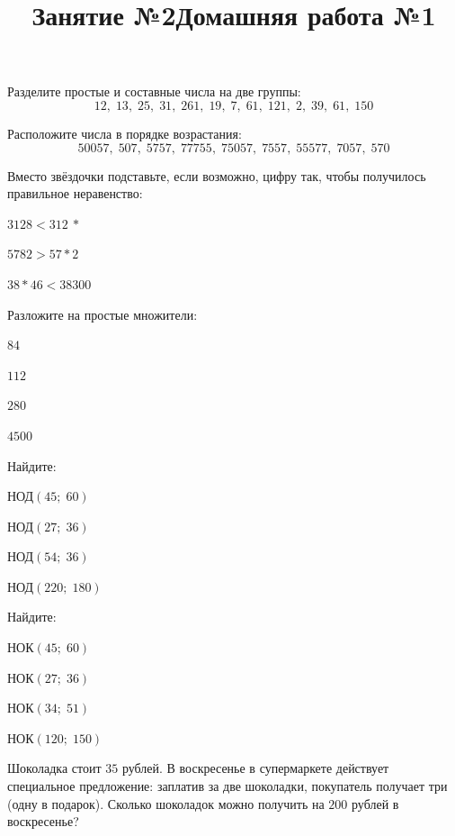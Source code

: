 \newpage
\title{Занятие №2}
\begin{listofex}
	\item Разделите простые и составные числа на две группы:
	\[ 12,\;13,\;25,\;31,\;261,\;19,\;7,\;61,\;121,\;2,\;39,\;61,\;150 \]
	\item Расположите числа в порядке возрастания:
	\[ 50057,\;507,\;5757,\;77755,\;75057,\;7557,\;55577,\;7057,\;570 \]
	\item Вместо звёздочки подставьте, если возможно, цифру так, чтобы получилось правильное
	неравенство:
	\begin{enumcols}[itemcolumns=3]
		\item \( 3128 < 312\:* \)
		\item \( 5782 > 57*2 \)
		\item \( 38*46 < 38300 \)
	\end{enumcols}
	\item Разложите на простые множители:
	\begin{enumcols}[itemcolumns=4]
		\item \( 84 \)
		\item \( 112 \)
		\item \( 280 \)
		\item \( 4500 \)
	\end{enumcols}
	\item Найдите:
	\begin{enumcols}[itemcolumns=4]
		\item НОД\( (45;\;60) \)
		\item НОД\( (27;\;36) \)
		\item НОД\( (54;\;36) \)
		\item НОД\( (220;\;180) \)
	\end{enumcols}
	\item Найдите:
	\begin{enumcols}[itemcolumns=4]
		\item НОК\( (45;\;60) \)
		\item НОК\( (27;\;36) \)
		\item НОК\( (34;\;51) \)
		\item НОК\( (120;\;150) \)
	\end{enumcols}
	\item Шоколадка стоит \( 35 \) рублей. В воскресенье в супермаркете действует специальное
	предложение: заплатив за две шоколадки, покупатель получает три (одну в подарок). Сколько
	шоколадок можно получить на \( 200 \) рублей в воскресенье?
\end{listofex}
\newpage
\title{Домашняя работа №1}
